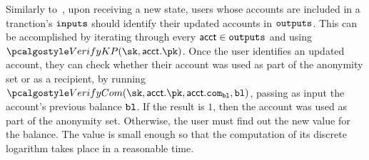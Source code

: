     Similarly to~\cite{fauzi2019quisquis}, upon receiving a new state, users whose accounts are included in a tranction's ${\textup{\texttt{inputs}}}$ should identify their updated accounts in ${\textup{\texttt{outputs}}}$. This can be accomplished by iterating through every $\textup{\textsf{acct}} \in {\textup{\texttt{outputs}}}$ and using $\verkp(\sk, \acct.\pk)$. Once the user identifies an updated account, they can check whether their account was used as part of the anonymity set or as a recipient, by running $\vercom(\sk, \acct.\pk, \acct.\com_\varbl, \varbl)$, passing as input the account's previous balance $\textup{\texttt{{bl}}}$. If the result is $1$, then the account was used as part of the anonymity set. Otherwise, the user must find out the new value for the balance. The value is small enough so that the computation of its discrete logarithm takes place in a reasonable time. 

    
